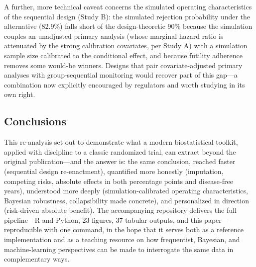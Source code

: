 A further, more technical caveat concerns the simulated operating
characteristics of the sequential design (Study B): the simulated
rejection probability under the alternative (82.9\%) falls short of the
design-theoretic 90\% because the simulation couples an unadjusted
primary analysis (whose marginal hazard ratio is attenuated by the
strong calibration covariates, per Study A) with a simulation sample
size calibrated to the conditional effect, and because futility
adherence removes some would-be winners. Designs that pair
covariate-adjusted primary analyses with group-sequential monitoring
would recover part of this gap---a combination now explicitly
encouraged by regulators \citep{fda2023} and worth studying in its own
right.

\subsection{Conclusions}

This re-analysis set out to demonstrate what a modern biostatistical
toolkit, applied with discipline to a classic randomized trial, can
extract beyond the original publication---and the answer is: the same
conclusion, reached faster (sequential design re-enactment), quantified
more honestly (imputation, competing risks, absolute effects in both
percentage points and disease-free years), understood more deeply
(simulation-calibrated operating characteristics, Bayesian robustness,
collapsibility made concrete), and personalized in direction
(risk-driven absolute benefit). The accompanying repository delivers the
full pipeline---R and Python, 23 figures, 37 tabular outputs, and this
paper---reproducible with one command, in the hope that it serves both
as a reference implementation and as a teaching resource on how
frequentist, Bayesian, and machine-learning perspectives can be made to
interrogate the same data in complementary ways.
